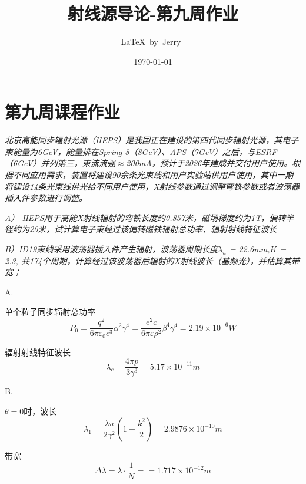 \documentclass{article}
\title{射线源导论-第九周作业}
\author{\LaTeX\ by\ Jerry\ }
\date{\today}
\begin{document}
\pagestyle{fancy}

\fancyhead[R]{\today}

\section*{第九周课程作业}

\emph{北京高能同步辐射光源（HEPS）是我国正在建设的第四代同步辐射光源，其电子束能量为6GeV，能量排在Spring-8（8GeV）、APS（7GeV）之后，与ESRF（6GeV）并列第三，束流流强$\approx$200mA，预计于2026年建成并交付用户使用。根据不同应用需求，装置将建设90余条光束线和用户实验站供用户使用，其中一期将建设14条光束线供光给不同用户使用，X射线参数通过调整弯铁参数或者波荡器插入件参数进行调整。}

\emph{A） HEPS用于高能X射线辐射的弯铁长度约0.857米，磁场梯度约为1T，偏转半径约为20米，试计算电子束经过该偏转磁铁辐射总功率、辐射射线特征波长}

\emph{B）ID19束线采用波荡器插入件产生辐射，波荡器周期长度$\lambda_u$ = 22.6mm,$K$ = 2.3, 共174个周期，计算经过该波荡器后辐射的X射线波长（基频光），并估算其带宽；}

A.


单个粒子同步辐射总功率$$P_0=\frac{q^2}{6\pi \varepsilon_0 c^3}\alpha^2\gamma^4=\frac{e^2c}{6\pi \varepsilon \rho^2}\beta^4\gamma^4 = 2.19 \times 10^{-6}W$$

辐射射线特征波长 $$\lambda_c=\frac{4 \pi p}{3 \gamma^3}=5.17\times 10^{-11}m$$

B.

$\theta = 0$时，波长$$\lambda_1 = \frac{\lambda u}{2\gamma^2}\left(1+\frac{k^2}{2}\right)=2.9876\times 10^{-10}m$$

带宽$$\Delta \lambda = \lambda\cdot\frac{1}{N}= = 1.717\times 10^{-12}m$$
\end{document}
